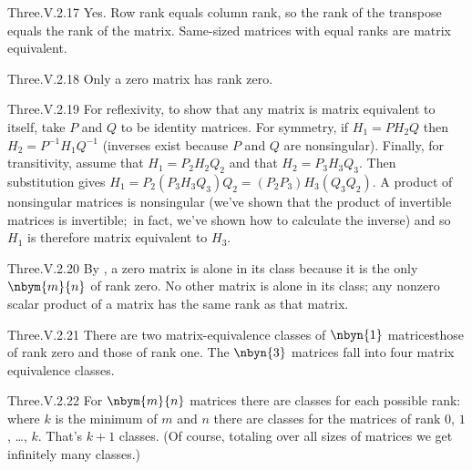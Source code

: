 \begin{ans}{Three.V.2.17}
      Yes.
      Row rank equals column rank, so the rank of the transpose equals
      the rank of the matrix.
      Same-sized matrices with equal ranks are matrix equivalent.
    
\end{ans}
\begin{ans}{Three.V.2.18}
      Only a zero matrix has rank zero.
    
\end{ans}
\begin{ans}{Three.V.2.19}
      For reflexivity, to show that any matrix is matrix equivalent to
      itself,
      take \( P \) and \( Q \) to be identity matrices.
      For symmetry, if \( H_1=PH_2Q \) then
      \( H_2=P^{-1}H_1Q^{-1} \) (inverses exist because $P$ and $Q$ are
      nonsingular).
      Finally, for transitivity, assume that \( H_1=P_2H_2Q_2 \) and
      that \( H_2=P_3H_3Q_3 \).
      Then substitution gives
      \( H_1=P_2(P_3H_3Q_3)Q_2=(P_2P_3)H_3(Q_3Q_2) \).
      A product of nonsingular matrices is nonsingular (we've shown that
      the product of invertible matrices is invertible;~in fact, we've shown
      how to calculate the inverse) and so \( H_1 \) is therefore
      matrix equivalent to \( H_3 \).
     
\end{ans}
\begin{ans}{Three.V.2.20}
      By , a zero matrix is alone
      in its class because it is the only \( \nbym{m}{n} \) of rank zero.
      No other matrix is alone in its class;
      any nonzero scalar product of a matrix
      has the same rank as that matrix.
    
\end{ans}
\begin{ans}{Three.V.2.21}
      There are two matrix-equivalence classes of \( \nbyn{1} \)
      matrices\Dash those of rank zero and those of rank one.
      The  \( \nbyn{3} \) matrices fall into four matrix equivalence
      classes.
    
\end{ans}
\begin{ans}{Three.V.2.22}
      For \( \nbym{m}{n} \) matrices there are classes for each possible
      rank: where \( k \)  is the minimum of \( m \) and \( n \) there are
      classes for the matrices of rank \( 0 \), \( 1 \), \ldots, \( k \).
      That's \( k+1 \) classes.
      (Of course, totaling over all sizes of matrices we get infinitely
      many classes.)
    
\end{ans}
